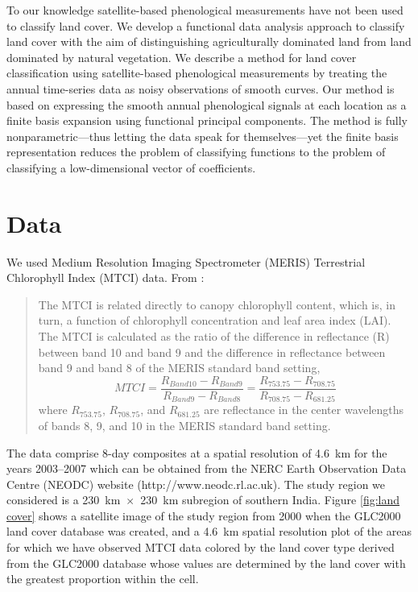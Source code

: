 To our knowledge satellite-based phenological measurements have not been used to classify land cover. We develop a functional data analysis approach to classify land cover with the aim of distinguishing agriculturally dominated land from land dominated by natural vegetation. We describe a method for land cover classification using satellite-based phenological measurements by treating the annual time-series data as noisy observations of smooth curves. Our method is based on expressing the smooth annual phenological signals at each location as a finite basis expansion using functional principal components. The method is fully nonparametric---thus letting the data speak for themselves---yet the finite basis representation reduces the problem of classifying functions to the problem of classifying a low-dimensional vector of coefficients. 

\section{Data} \label{sec:data}

 We used Medium Resolution Imaging Spectrometer (MERIS) Terrestrial Chlorophyll Index (MTCI) data. From \cite{Dash:2010kva}:
\begin{quote}
The MTCI is related directly to canopy chlorophyll content, which is, in turn, a function of chlorophyll concentration and leaf area index (LAI). The MTCI is calculated as the ratio of the difference in reflectance (R) between band 10 and band 9 and the difference in reflectance between band 9 and band 8 of the MERIS standard band setting,
\begin{equation}
	MTCI = \frac{R_{Band 10} - R_{Band 9}}{R_{Band 9} - R_{Band 8}} = \frac{R_{ 753.75} - R_{708.75}}{R_{ 708.75} - R_{ 681.25}} \nonumber
\end{equation}
where $R_{753.75}$, $R_{708.75}$, and $R_{681.25}$ are reflectance in the center wavelengths of bands 8, 9, and 10 in the MERIS standard band setting.
\end{quote}

 The data comprise 8-day composites at a spatial resolution of 4.6~km for the years 2003--2007 which can be obtained from the NERC Earth Observation Data Centre (NEODC) website (http://www.neodc.rl.ac.uk). The study region we considered is a 230~km~$\times$~230~km subregion of southern India. Figure \ref{fig:land cover} shows a satellite image of the study region from 2000 when the GLC2000 land cover database was created, and a 4.6~km spatial resolution plot of the areas for which we have observed MTCI data colored by the land cover type derived from the GLC2000 database whose values are determined by the land cover with the greatest proportion within the cell.  
 
